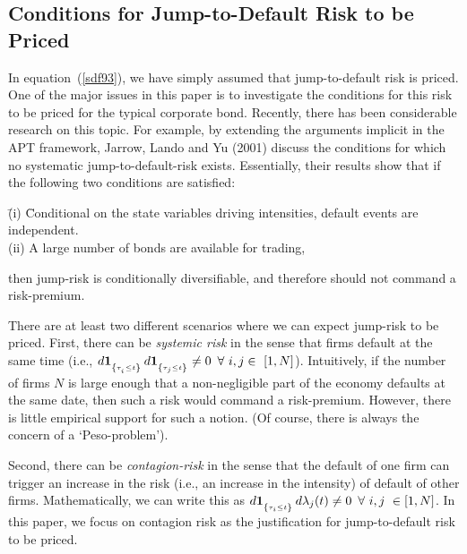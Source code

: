 \documentclass[titlepage,11pt]{article}
\begin{document}

\subsection{Conditions for Jump-to-Default Risk to be Priced}

In equation~(\ref{sdf93}), we have simply assumed that jump-to-default risk is priced.
One of the major issues in this paper is to investigate the conditions for this risk to be priced
for the typical corporate bond.  Recently, there has been considerable research on this topic.
For example, by extending the arguments implicit in the APT framework,
Jarrow, Lando and Yu (2001) discuss the conditions for which no systematic
jump-to-default-risk exists.  Essentially, their results show that if the following
two conditions are satisfied:
\begin{tabbing}
\hspace*{5mm} \=(i) \=Conditional on the state variables driving intensities, default events
are independent. \\
\>(ii) A large number of bonds are available for trading,
\end{tabbing}
then jump-risk is conditionally diversifiable, and therefore should not command
a risk-premium.

There are at least two different scenarios where we can expect jump-risk to be priced.\nocite{jarlan00}
First, there can be {\em systemic risk} in the sense that
firms default at the same time (i.e., $d{\bf 1}_{_{{\left\{{\tau_{_{{i}}}\leq t}\right\}}}} \, d{\bf 1}_{_{{\left\{{\tau_{j}\leq t}\right\}}}} \neq
0\,\,\,\forall\,\, i,j\in\,\, [1,N]$).
Intuitively, if the number of firms $N$ is large enough that a non-negligible part of the
economy defaults at the same date, then such a
risk would command a risk-premium. However, there is little empirical support for such a
notion. (Of course, there is always the concern of a `Peso-problem').

Second, there can be {\em contagion-risk} in the sense that the default of one firm
can trigger an increase in the risk (i.e., an increase in the intensity) of default of
other firms. Mathematically, we can write this as
$d{\bf 1}_{_{{\left\{{\tau_i\leq t}\right\}}}} \, d\lambda_j(t)\neq 0\,\,\,\forall\,\,i,j\,\,\in[1,N]$.  In this paper,
we focus on contagion risk as the justification for jump-to-default risk to be priced.
\end{document}
